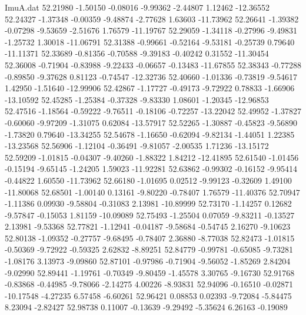 \begin{filecontents}{ImuA.dat}
  52.21980   -1.50150   -0.08016   -9.99362   -2.44807    1.12462  -12.36552
  52.24327   -1.37348   -0.00359   -9.48874   -2.77628    1.63603  -11.73962
  52.26641   -1.39382   -0.07298   -9.53659   -2.51676    1.76579  -11.19767
  52.29059   -1.34118   -0.27996   -9.49831   -1.25732    1.30018  -11.06791
  52.31388   -0.99661   -0.52164   -9.53181   -0.25739    0.79640  -11.11371
  52.33689   -0.81356   -0.70588   -9.39183   -0.40242    0.31552  -11.30454
  52.36008   -0.71904   -0.83988   -9.22433   -0.06657   -0.13483  -11.67855
  52.38343   -0.77288   -0.89850   -9.37628    0.81123   -0.74547  -12.32736
  52.40660   -1.01336   -0.73819   -9.54617    1.42950   -1.51640  -12.99906
  52.42867   -1.17727   -0.49173   -9.72922    0.78833   -1.66906  -13.10592
  52.45285   -1.25384   -0.37328   -9.83330    1.08601   -1.20345  -12.96853
  52.47516   -1.18564   -0.59222   -9.76511   -0.18106   -0.72257  -13.22042
  52.49952   -1.37827   -0.60060   -9.97209   -1.31075    0.62084  -13.57917
  52.52265   -1.30887   -0.45823   -9.56890   -1.73820    0.79640  -13.34255
  52.54678   -1.16650   -0.62094   -9.82134   -1.44051    1.22385  -13.23568
  52.56906   -1.12104   -0.36491   -9.81057   -2.00535    1.71236  -13.15172
  52.59209   -1.01815   -0.04307   -9.40260   -1.88322    1.84212  -12.41895
  52.61540   -1.01456   -0.15194   -9.65145   -1.24205    1.59023  -11.92281
  52.63862   -0.99302   -0.16152   -9.95414   -0.44822    1.60550  -11.73962
  52.66180   -1.01695    0.02512   -9.99123   -0.32609    1.49100  -11.80068
  52.68501   -1.00140    0.13161   -9.80220   -0.78407    1.76579  -11.40376
  52.70947   -1.11386    0.09930   -9.58804   -0.31083    2.13981  -10.89999
  52.73170   -1.14257    0.12682   -9.57847   -0.15053    1.81159  -10.09089
  52.75493   -1.25504    0.07059   -9.83211   -0.13527    2.13981   -9.53368
  52.77821   -1.12941   -0.04187   -9.58684   -0.54745    2.16270   -9.10623
  52.80138   -1.09352   -0.27757   -9.68495   -0.78407    2.36880   -8.77038
  52.82473   -1.01815   -0.50369   -9.72922   -0.59325    2.62832   -8.89251
  52.84779   -0.99781   -0.65085   -9.73281   -1.08176    3.13973   -9.09860
  52.87101   -0.97986   -0.71904   -9.56052   -1.85269    2.84204   -9.02990
  52.89441   -1.19761   -0.70349   -9.80459   -1.45578    3.30765   -9.16730
  52.91768   -0.83868   -0.44985   -9.78066   -2.14275    4.00226   -8.93831
  52.94096   -0.16510   -0.02871  -10.17548   -4.27235    6.57458   -6.60261
  52.96421    0.08853    0.02393   -9.72084   -5.84475    8.23094   -2.82427
  52.98738    0.11007   -0.13639   -9.29492   -5.35624    6.26163   -0.19089

\end{filecontents}
